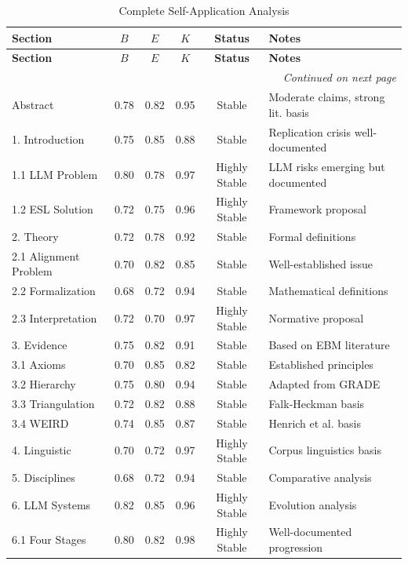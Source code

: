 \documentclass[11pt,a4paper]{article}
\begin{document}
\begin{longtable}{p{3.5cm}ccccp{4cm}}
\caption{Complete Self-Application Analysis} \\
\toprule
\textbf{Section} & \textbf{$B$} & \textbf{$E$} & \textbf{$K$} & \textbf{Status} & \textbf{Notes} \\
\midrule
\endfirsthead
\toprule
\textbf{Section} & \textbf{$B$} & \textbf{$E$} & \textbf{$K$} & \textbf{Status} & \textbf{Notes} \\
\midrule
\endhead
\midrule
\multicolumn{6}{r}{\textit{Continued on next page}} \\
\endfoot
\bottomrule
\endlastfoot

Abstract & 0.78 & 0.82 & 0.95 & Stable & Moderate claims, strong lit. basis \\
1. Introduction & 0.75 & 0.85 & 0.88 & Stable & Replication crisis well-documented \\
1.1 LLM Problem & 0.80 & 0.78 & 0.97 & Highly Stable & LLM risks emerging but documented \\
1.2 ESL Solution & 0.72 & 0.75 & 0.96 & Highly Stable & Framework proposal \\
2. Theory & 0.72 & 0.78 & 0.92 & Stable & Formal definitions \\
2.1 Alignment Problem & 0.70 & 0.82 & 0.85 & Stable & Well-established issue \\
2.2 Formalization & 0.68 & 0.72 & 0.94 & Stable & Mathematical definitions \\
2.3 Interpretation & 0.72 & 0.70 & 0.97 & Highly Stable & Normative proposal \\
3. Evidence & 0.75 & 0.82 & 0.91 & Stable & Based on EBM literature \\
3.1 Axioms & 0.70 & 0.85 & 0.82 & Stable & Established principles \\
3.2 Hierarchy & 0.75 & 0.80 & 0.94 & Stable & Adapted from GRADE \\
3.3 Triangulation & 0.72 & 0.82 & 0.88 & Stable & Falk-Heckman basis \\
3.4 WEIRD & 0.74 & 0.85 & 0.87 & Stable & Henrich et al. basis \\
4. Linguistic & 0.70 & 0.72 & 0.97 & Highly Stable & Corpus linguistics basis \\
5. Disciplines & 0.68 & 0.72 & 0.94 & Stable & Comparative analysis \\
6. LLM Systems & 0.82 & 0.85 & 0.96 & Highly Stable & Evolution analysis \\
6.1 Four Stages & 0.80 & 0.82 & 0.98 & Highly Stable & Well-documented progression \\

\end{longtable}
\end{document}
